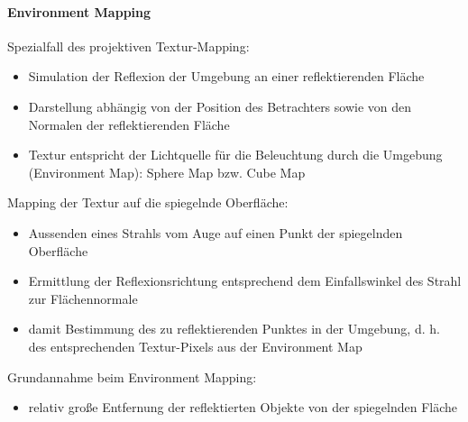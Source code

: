 \documentclass[10pt,landscape]{article}
\begin{document}
\begin{multicols}{3}
\paragraph{Environment Mapping}
Spezialfall des projektiven Textur-Mapping:
\begin{itemize}
  \item Simulation der Reflexion der Umgebung an einer reflektierenden Fläche
  \item Darstellung abhängig von der Position des Betrachters sowie von den Normalen der reflektierenden Fläche
  \item Textur entspricht der Lichtquelle für die Beleuchtung durch die Umgebung (Environment Map): Sphere Map bzw. Cube Map
\end{itemize}

Mapping der Textur auf die spiegelnde Oberfläche:
\begin{itemize}
  \item Aussenden eines Strahls vom Auge auf einen Punkt der spiegelnden Oberfläche
  \item Ermittlung der Reflexionsrichtung entsprechend dem Einfallswinkel des Strahl zur Flächennormale
  \item damit Bestimmung des zu reflektierenden Punktes in der Umgebung, d. h. des entsprechenden Textur-Pixels aus der Environment Map
\end{itemize}

Grundannahme beim Environment Mapping:
\begin{itemize}
  \item relativ große Entfernung der reflektierten Objekte von der spiegelnden Fläche
\end{itemize}


\end{multicols}
\end{document}
